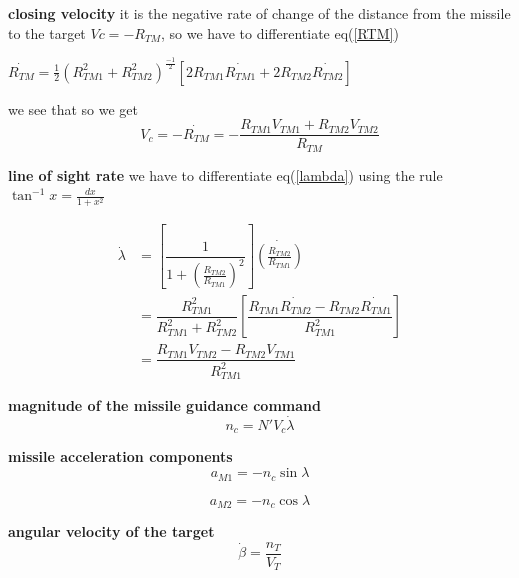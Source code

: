 \textbf{closing velocity} it is the negative rate of change of the distance
from the missile to the target $Vc= -R_{TM} $, so we have to differentiate eq(\ref{RTM})

\begin{center}
	$\dot{R_{TM}}= \frac{1}{2} (R_{TM1}^2 + R_{TM2}^2)^{\frac{-1}{2}} [2 R_{TM1} \dot{R_{TM1}} + 2 R_{TM2} \dot{R_{TM2}}]$
\end{center}

we see that
so we get 
\begin{equation}
	V_c = - \dot{R_{TM}} = - \dfrac{R_{TM1} V_{TM1}+R_{TM2} V_{TM2}}{R_{TM}}
\end{equation}

\textbf{line of sight rate} we have to differentiate eq(\ref{lambda}) using the rule $\tan^{-1}x = \frac{dx}{1+x^2}$ 

\begin{equation}
	\begin{split}
	\dot{\lambda} &= [\dfrac{1}{1+(\frac{R_{TM2}}{R_{TM1}})^2}] \dot{(\frac{R_{TM2}}{R_{TM1}})}\\
	&= \dfrac{R_{TM1}^2}{R_{TM1}^2 + R_{TM2}^2}[\dfrac{R_{TM1}\dot{R_{TM2}}- R_{TM2} \dot{R_{TM1}}}{R_{TM1}^2}]\\
	&=\dfrac{R_{TM1} V_{TM2} - R_{TM2} V_{TM1}}{R_{TM1}^2}
	\end{split}
\end{equation}

\textbf{magnitude of the missile guidance command}
\begin{equation}
		n_c= N' V_c \dot{\lambda}
\end{equation}

\textbf{missile acceleration components}
\begin{equation}
	a_{M1} = - n_c \sin \lambda
\end{equation}

\begin{equation}
a_{M2} = - n_c \cos \lambda
\end{equation}

\textbf{angular velocity of the target}
\begin{equation}
	\dot{\beta} = \dfrac{n_T}{V_T}
\end{equation}

